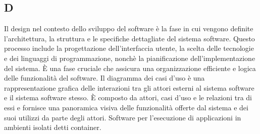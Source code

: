 \begin{center}
\section*{D}
\end{center}
Il design nel contesto dello sviluppo del software è la fase in cui vengono definite l'architettura, la struttura e le specifiche dettagliate del sistema software. Questo processo include la progettazione dell'interfaccia utente, la scelta delle tecnologie e dei linguaggi di programmazione, nonchè la pianificazione dell'implementazione del sistema. È una fase cruciale che assicura una organizzazione efficiente e logica delle funzionalità del software.
Il diagramma dei casi d'uso è una rappresentazione grafica delle interazioni tra gli attori esterni al sistema software e il sistema software stesso. È composto da attori, casi d'uso e le relazioni tra di essi e fornisce una panoramica visiva delle funzionalità offerte dal sistema e dei suoi utilizzi da parte degli attori.
Software per l'esecuzione di applicazioni in ambienti isolati detti container.
